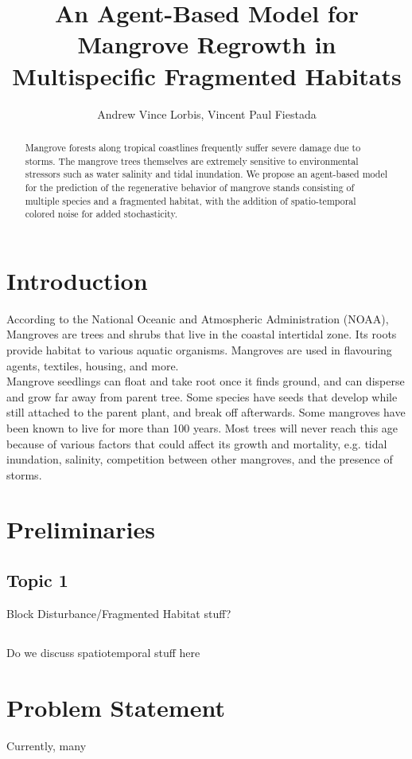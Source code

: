 \documentclass[12pt,letterpaper]{article}
\title{An Agent-Based Model for Mangrove Regrowth in Multispecific Fragmented Habitats}
\author{Andrew Vince Lorbis, Vincent Paul Fiestada}
\begin{document}
\prefacepages

\begin{abstract}
Mangrove forests along tropical coastlines frequently suffer severe damage due to storms. The mangrove trees themselves are extremely sensitive to environmental stressors such as water salinity and tidal inundation. We propose an agent-based model for the prediction of the regenerative behavior of mangrove stands consisting of multiple species and a fragmented habitat, with the addition of spatio-temporal colored noise for added stochasticity. 
\end{abstract}

\afterpreface

\section{Introduction}
According to the National Oceanic and Atmospheric Administration (NOAA), Mangroves are trees and shrubs that live in the coastal intertidal zone. Its roots provide habitat to various aquatic organisms. Mangroves are used in flavouring agents, textiles, housing, and more.\\ 
Mangrove seedlings can float and take root once it finds ground, and can disperse and grow far away from parent tree. Some species have seeds that develop while still attached to the parent plant, and break off afterwards.
Some mangroves have been known to live for more than 100 years. Most trees will never reach this age because of various factors that could affect its growth and mortality, e.g. tidal inundation, salinity, competition between other mangroves, and the presence of storms.
\section{Preliminaries}
\subsection{Topic 1}
Block Disturbance/Fragmented Habitat stuff?

\subsection{}
Do we discuss spatiotemporal stuff here

\section{Problem Statement}
Currently, many 
\end{document}
